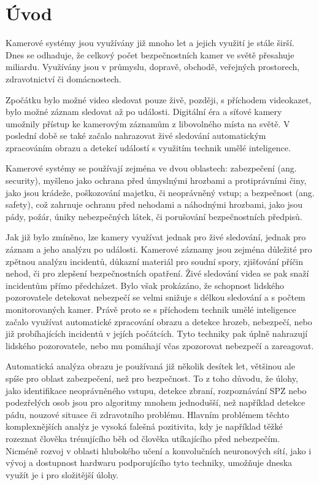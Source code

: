\chapter{Úvod}
\label{sec:Introduction}

Kamerové systémy jsou využívány již mnoho let a jejich využití je stále širší.
Dnes se odhaduje, že celkový počet bezpečnostních kamer ve světě přesahuje
miliardu. Využívány jsou v průmyslu, dopravě, obchodě, veřejných prostorech,
zdravotnictví či domácnostech.

Zpočátku bylo možné video sledovat pouze živě, později, s příchodem videokazet,
bylo možné záznam sledovat až po události. Digitální éra a síťové kamery
umožnily přístup ke kamerovým záznamům z libovolného místa na světě. V poslední
době se také začalo nahrazovat živé sledování automatickým zpracováním obrazu a
detekcí událostí s využitím technik umělé inteligence.

Kamerové systémy se používají zejména ve dvou oblastech: zabezpečení (ang.
security), myšleno jako ochrana před úmyslnými hrozbami a protiprávními činy,
jako jsou krádeže, poškozování majetku, či neoprávněný vstup; a bezpečnost
(ang. safety), což zahrnuje ochranu před nehodami a náhodnými hrozbami, jako
jsou pády, požár, úniky nebezpečných látek, či porušování bezpečnostních
předpisů.

Jak již bylo zmíněno, lze kamery využívat jednak pro živé sledování, jednak pro
záznam a jeho analýzu po události. Kamerové záznamy jsou zejména důležité pro
zpětnou analýzu incidentů, důkazní materiál pro soudní spory, zjišťování příčin
nehod, či pro zlepšení bezpečnostních opatření. Živé sledování videa se pak
snaží incidentům přímo předcházet. Bylo však prokázáno, že schopnost lidského
pozorovatele detekovat nebezpečí se velmi snižuje s délkou sledování a s počtem
monitorovaných kamer. Právě proto se s příchodem technik umělé inteligence
začalo využívat automatické zpracování obrazu a detekce hrozeb, nebezpečí, nebo
již probíhajících incidentů v jejích počátcích. Tyto techniky pak úplně
nahrazují lidského pozorovatele, nebo mu pomáhají včas zpozorovat nebezpečí a
zareagovat.

Automatická analýza obrazu je používaná již několik desítek let, většinou ale
spíše pro oblast zabezpečení, než pro bezpečnost. To z toho důvodu, že úlohy,
jako identifikace neoprávněného vstupu, detekce zbraní, rozpoznávání SPZ nebo
podezřelých osob jsou pro algoritmy mnohem jednodušší, než například detekce
pádu, nouzové situace či zdravotního problému. Hlavním problémem těchto
komplexnějších analýz je vysoká falešná pozitivita, kdy je například těžké
rozeznat člověka trénujícího běh od člověka utíkajícího před nebezpečím.
Nicméně rozvoj v oblasti hlubokého učení a konvolučních neuronových sítí, jako
i vývoj a dostupnost hardwaru podporujícího tyto techniky, umožňuje dneska využít
je i pro složitější úlohy.

